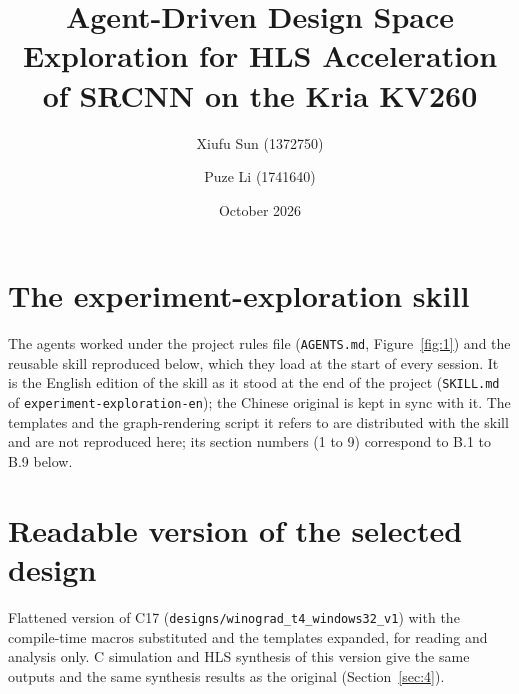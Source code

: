 \ifcompact\documentclass[10pt,a4paper]{article}\else\documentclass[11pt,a4paper]{article}\fi
\title{\textbf{Agent-Driven Design Space Exploration for HLS Acceleration of SRCNN on the Kria KV260}}
\author{Xiufu Sun (1372750) \and Puze Li (1741640)}
\date{October 2026}
\begin{document}
\maketitle
\tableofcontents
\clearpage










\clearpage
\appendix

\clearpage


\clearpage
\section{The experiment-exploration skill}\label{app:skill}
The agents worked under the project rules file (\texttt{AGENTS.md}, Figure~\ref{fig:1}) and the
reusable skill reproduced below, which they load at the start of every session. It is the
English edition of the skill as it stood at the end of the project (\texttt{SKILL.md} of
\texttt{experiment-exploration-en}); the Chinese original is kept in sync with it. The
templates and the graph-rendering script it refers to are distributed with the skill and are
not reproduced here; its section numbers (1 to 9) correspond to B.1 to B.9 below.


\clearpage
\section{Readable version of the selected design}\label{app:code-readable}
Flattened version of C17 (\texttt{designs/\allowbreak winograd\_t4\_windows32\_v1}) with the compile-time
macros substituted and the templates expanded, for reading and analysis only. C simulation and
HLS synthesis of this version give the same outputs and the same synthesis results as the original
(Section~\ref{sec:4}).

\end{document}
